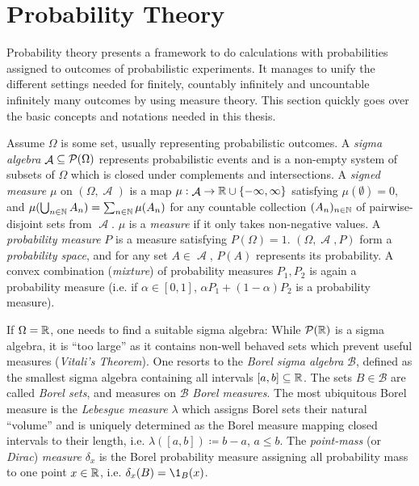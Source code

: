 \documentclass[a4paper]{scrreprt}
\DeclareMathOperator{\A}{\mathcal{A}}
\newcommand{\B}{\mathcal{B}}
\theoremstyle{definition}
\begin{document}
    \section{Probability Theory}
    Probability theory presents a framework to do calculations with probabilities assigned to outcomes of probabilistic experiments. It manages to unify the different settings needed for finitely, countably infinitely and uncountable infinitely many outcomes by using measure theory. This section quickly goes over the basic concepts and notations needed in this thesis.
    
    Assume $\Omega$ is some set, usually representing probabilistic outcomes. 
    A \emph{sigma algebra} $\A \subseteq \Pot(\Omega)$ represents probabilistic events and is a non-empty system of subsets of $\Omega$ which is closed under complements and intersections.
    A \emph{signed measure} $\mu$ on $(\Omega, \A)$ is a map $\mu: \A \to \R \cup \set{-\infty, \infty}$ satisfying $\mu(\emptyset) = 0$, and $\mu(\bigcup_{n \in \mathbb{N}} A_n) = \sum_{n \in \mathbb{N}}\mu(A_n)$ for any countable collection $(A_n)_{n \in \mathbb{N}}$ of pairwise-disjoint sets from $\A$.
    $\mu$ is a \emph{measure} if it only takes non-negative values.
    A \emph{probability measure} $P$ is a measure satisfying $P(\Omega) = 1$.
    $(\Omega, \A, P)$ form a \emph{probability space}, and for any set $A \in \A$, $P(A)$ represents its probability.
    A convex combination (\emph{mixture}) of probability measures $P_1, P_2$ is again a probability measure (i.e. if $\alpha \in [0, 1]$, $\alpha P_1 + (1-\alpha) P_2$ is a probability measure).
    
    If $\Omega = \mathbb{R}$, one needs to find a suitable sigma algebra: While $\operatorname{\mathcal{P}}(\mathbb{R})$ is a sigma algebra, it is “too large” as it contains non-well behaved sets which prevent useful measures (\emph{Vitali's Theorem}).
    One resorts to the \emph{Borel sigma algebra} $\B$, defined as the smallest sigma algebra containing all intervals $[a, b] \subseteq \mathbb{R}$.
    The sets $B \in \B$ are called \emph{Borel sets}, and measures on $\B$ \emph{Borel measures}.
    The most ubiquitous Borel measure is the \emph{Lebesgue measure} $\lambda$ which assigns Borel sets their natural “volume” and is uniquely determined as the Borel measure mapping closed intervals to their length, i.e. $\lambda([a, b]) \coloneqq b-a$, $a \leq b$.
    The \emph{point-mass} (or \emph{Dirac}) \emph{measure} $\delta_x$ is the Borel probability measure assigning all probability mass to one point $x \in \mathbb{R}$, i.e. $\delta_x(B) = \1_B(x)$.
\end{document}
